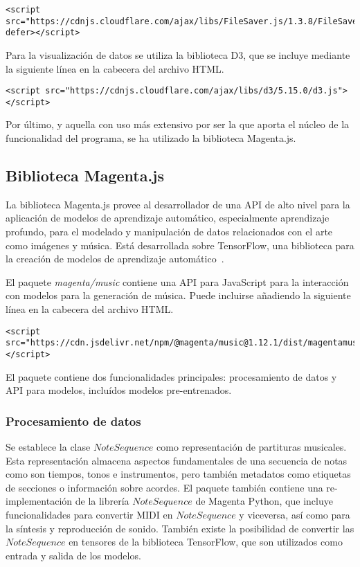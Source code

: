 \begin{lstlisting}
<script src="https://cdnjs.cloudflare.com/ajax/libs/FileSaver.js/1.3.8/FileSaver.min.js" defer></script>
\end{lstlisting}

Para la visualización de datos se utiliza la biblioteca D3, que se incluye mediante la siguiente línea en la cabecera del archivo HTML.

\begin{lstlisting}
<script src="https://cdnjs.cloudflare.com/ajax/libs/d3/5.15.0/d3.js"></script>
\end{lstlisting}

Por último, y aquella con uso más extensivo por ser la que aporta el núcleo de la funcionalidad del programa, se ha utilizado la biblioteca Magenta.js.

\subsection{Biblioteca Magenta.js}

La biblioteca Magenta.js provee al desarrollador de una API de alto nivel para la aplicación de modelos de aprendizaje automático, especialmente aprendizaje profundo, para el modelado y manipulación de datos relacionados con el arte como imágenes y música. Está desarrollada sobre TensorFlow, una biblioteca para la creación de modelos de aprendizaje automático~\cite{magentajs}.

El paquete \textit{magenta/music} contiene una API para JavaScript para la interacción con modelos para la generación de música. Puede incluirse añadiendo la siguiente línea en la cabecera del archivo HTML.

\begin{lstlisting}
<script src="https://cdn.jsdelivr.net/npm/@magenta/music@1.12.1/dist/magentamusic.min.js"></script>
\end{lstlisting}

El paquete contiene dos funcionalidades principales: procesamiento de datos y API para modelos, incluídos modelos pre-entrenados.

\subsubsection{Procesamiento de datos}

Se establece la clase $\textit{NoteSequence}$ como representación de partituras musicales. Esta representación almacena aspectos fundamentales de una secuencia de notas como son tiempos, tonos e instrumentos, pero también metadatos como etiquetas de secciones o información sobre acordes. El paquete también contiene una re-implementación de la librería $\textit{NoteSequence}$ de Magenta Python, que incluye funcionalidades para convertir MIDI en $\textit{NoteSequence}$ y viceversa, así como para la síntesis y reproducción de sonido. También existe la posibilidad de convertir las $\textit{NoteSequence}$ en tensores de la biblioteca TensorFlow, que son utilizados como entrada y salida de los modelos.

